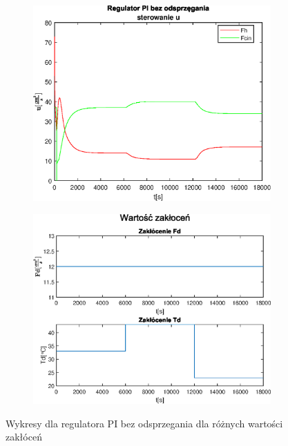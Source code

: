 \begin{figure}[h!]
   \begin{subfigure}[b]{0.4\textwidth}
      \includegraphics[width=1\linewidth]{img/PI/noDecoupler/disturbance/PINoDecouplerControl2.eps}
      \caption{}
      \label{fig:fig:PIDecoupler23}
   \end{subfigure}
       
   \begin{subfigure}[b]{0.4\textwidth}
      \includegraphics[width=1\linewidth]{img/PI/noDecoupler/disturbance/PIDecouplerDisturbance2.eps}
      \caption{}
      \label{fig:fig:PIDecoupler24}
   \end{subfigure}
       
   \caption{Wykresy dla regulatora PI bez odsprzegania dla różnych wartości zakłóceń}
   \label{fig:PIDecoupler2}
\end{figure}
           

